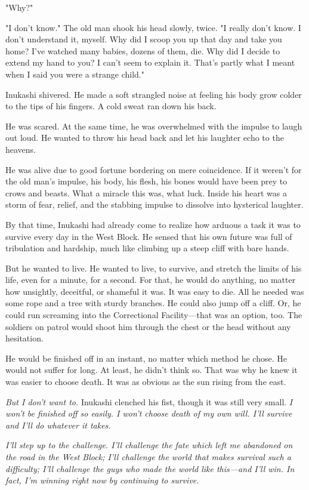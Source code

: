 "Why?"

"I don't know." The old man shook his head slowly, twice. "I really
don't know. I don't understand it, myself. Why did I scoop you up that
day and take you home? I've watched many babies, dozens of them, die.
Why did I decide to extend my hand to you? I can't seem to explain it.
That's partly what I meant when I said you were a strange child."

Inukashi shivered. He made a soft strangled noise at feeling his body
grow colder to the tips of his fingers. A cold sweat ran down his back.

He was scared. At the same time, he was overwhelmed with the impulse to
laugh out loud. He wanted to throw his head back and let his laughter
echo to the heavens.

He was alive due to good fortune bordering on mere coincidence. If it
weren't for the old man's impulse, his body, his flesh, his bones would
have been prey to crows and beasts. What a miracle this was, what luck.
Inside his heart was a storm of fear, relief, and the stabbing impulse
to dissolve into hysterical laughter.

By that time, Inukashi had already come to realize how arduous a task it
was to survive every day in the West Block. He sensed that his own
future was full of tribulation and hardship, much like climbing up a
steep cliff with bare hands.

But he wanted to live. He wanted to live, to survive, and stretch the
limits of his life, even for a minute, for a second. For that, he would
do anything, no matter how unsightly, deceitful, or shameful it was. It
was easy to die. All he needed was some rope and a tree with sturdy
branches. He could also jump off a cliff. Or, he could run screaming
into the Correctional Facility---that was an option, too. The soldiers on
patrol would shoot him through the chest or the head without any
hesitation.

He would be finished off in an instant, no matter which method he chose.
He would not suffer for long. At least, he didn't think so. That was why
he knew it was easier to choose death. It was as obvious as the sun
rising from the east.

\emph{But I don't want to.} Inukashi clenched his fist, though it was still
very small. \emph{I won't be finished off so easily. I won't choose death of
my own will. I'll survive and I'll do whatever it takes.}

\emph{I'll step up to the challenge. I'll challenge the fate which left me
abandoned on the road in the West Block; I'll challenge the world that
makes survival such a difficulty; I'll challenge the guys who made the
world like this---and I'll win. In fact, I'm winning right now by
continuing to survive.}

